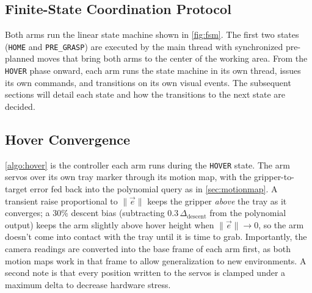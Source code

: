 \subsection{Finite-State Coordination Protocol}
\label{sec:protocol}
Both arms run the linear state machine shown in \cref{fig:fsm}. The first two states (\texttt{HOME} and \texttt{PRE\_GRASP}) are executed by the main thread with synchronized pre-planned moves that bring both arms to the center of the working area. From the \texttt{HOVER} phase onward, each arm runs the state machine in its own thread, issues its own commands, and transitions on its own visual events. The subsequent sections will detail each state and how the transitions to the next state are decided.


\subsection{Hover Convergence}
\label{sec:hover}
\cref{algo:hover} is the controller each arm runs during the
\texttt{HOVER} state. The arm servos over its own tray marker
through its motion map, with the gripper-to-target error fed back into the polynomial query as in \cref{sec:motionmap}. A transient raise proportional to $\|\vec{e}\|$ keeps the gripper \emph{above} the tray as it converges; a 30\% descent bias (subtracting $0.3\,\Delta_{\text{descent}}$ from the polynomial output) keeps the arm slightly above hover height when $\|\vec{e}\|\!\to\!0$, so the arm doesn't come into contact with the tray until it is time to grab. Importantly, the camera readings are converted into the base frame of each
arm first, as both motion maps work in that frame to allow generalization to new environments. A second note is that every position written to the servos is clamped under a maximum delta to decrease hardware stress.

